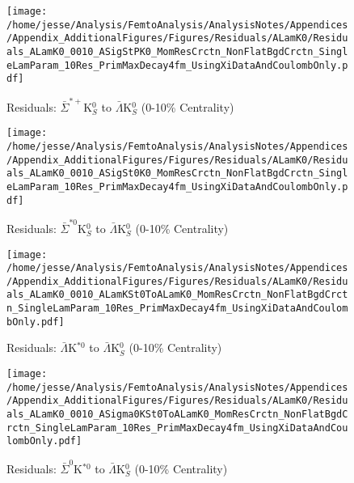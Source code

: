 \documentclass[/home/jesse/Analysis/FemtoAnalysis/AnalysisNotes/AnalysisNoteJBuxton.tex]{subfiles}
\begin{document}
\begin{figure}[h]
  \centering
  \texttt{[image: /home/jesse/Analysis/FemtoAnalysis/AnalysisNotes/Appendices/Appendix\_AdditionalFigures/Figures/Residuals/ALamK0/Residuals\_ALamK0\_0010\_ASigStPK0\_MomResCrctn\_NonFlatBgdCrctn\_SingleLamParam\_10Res\_PrimMaxDecay4fm\_UsingXiDataAndCoulombOnly.pdf]}
  \caption[Residuals: $\bar{\Sigma}^{*+}$K$^{0}_{S}$ to $\bar{\Lambda}$K$^{0}_{S}$ (0-10\% Centrality)]{Residuals: $\bar{\Sigma}^{*+}$K$^{0}_{S}$ to $\bar{\Lambda}$K$^{0}_{S}$ (0-10\% Centrality)}
  \label{fig:Res_ALamK0_0010_ASigStPK0}
\end{figure}

\begin{figure}[h]
  \centering
  \texttt{[image: /home/jesse/Analysis/FemtoAnalysis/AnalysisNotes/Appendices/Appendix\_AdditionalFigures/Figures/Residuals/ALamK0/Residuals\_ALamK0\_0010\_ASigSt0K0\_MomResCrctn\_NonFlatBgdCrctn\_SingleLamParam\_10Res\_PrimMaxDecay4fm\_UsingXiDataAndCoulombOnly.pdf]}
  \caption[Residuals: $\bar{\Sigma}^{*0}$K$^{0}_{S}$ to $\bar{\Lambda}$K$^{0}_{S}$ (0-10\% Centrality)]{Residuals: $\bar{\Sigma}^{*0}$K$^{0}_{S}$ to $\bar{\Lambda}$K$^{0}_{S}$ (0-10\% Centrality)}
  \label{fig:Res_ALamK0_0010_ASigSt0K0}
\end{figure}


\begin{figure}[h]
  \centering
  \texttt{[image: /home/jesse/Analysis/FemtoAnalysis/AnalysisNotes/Appendices/Appendix\_AdditionalFigures/Figures/Residuals/ALamK0/Residuals\_ALamK0\_0010\_ALamKSt0ToALamK0\_MomResCrctn\_NonFlatBgdCrctn\_SingleLamParam\_10Res\_PrimMaxDecay4fm\_UsingXiDataAndCoulombOnly.pdf]}
  \caption[Residuals: $\bar{\Lambda}$K$^{*0}$ to $\bar{\Lambda}$K$^{0}_{S}$ (0-10\% Centrality)]{Residuals: $\bar{\Lambda}$K$^{*0}$ to $\bar{\Lambda}$K$^{0}_{S}$ (0-10\% Centrality)}
  \label{fig:Res_ALamK0_0010_ALamKSt0}
\end{figure}


\begin{figure}[h]
  \centering
  \texttt{[image: /home/jesse/Analysis/FemtoAnalysis/AnalysisNotes/Appendices/Appendix\_AdditionalFigures/Figures/Residuals/ALamK0/Residuals\_ALamK0\_0010\_ASigma0KSt0ToALamK0\_MomResCrctn\_NonFlatBgdCrctn\_SingleLamParam\_10Res\_PrimMaxDecay4fm\_UsingXiDataAndCoulombOnly.pdf]}
  \caption[Residuals: $\bar{\Sigma}^{0}$K$^{*0}$ to $\bar{\Lambda}$K$^{0}_{S}$ (0-10\% Centrality)]{Residuals: $\bar{\Sigma}^{0}$K$^{*0}$ to $\bar{\Lambda}$K$^{0}_{S}$ (0-10\% Centrality)}
  \label{fig:Res_ALamK0_0010_ASig0KSt0}
\end{figure}
\end{document}
